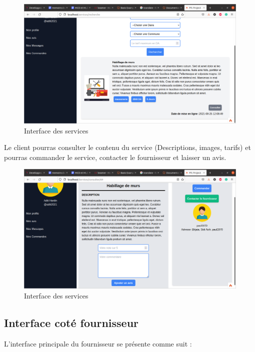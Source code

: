 \documentclass[french]{report}
\begin{document}
\begin{figure}[H]
    \centering
    \includegraphics[width=1\textwidth]{images/services.png} 
    \caption{Interface des services}
\end{figure}

Le client pourras consulter le contenu du service (Descriptions, images, tarifs)
et pourras commander le service, contacter le fournisseur et laisser un avis.

 \begin{figure}[H]
    \centering
    \includegraphics[width=1\textwidth]{images/service consult.png} 
    \caption{Interface des services}
\end{figure}

\subsection{Interface coté fournisseur}

L'interface principale du fournisseur se présente comme suit :
\end{document}
